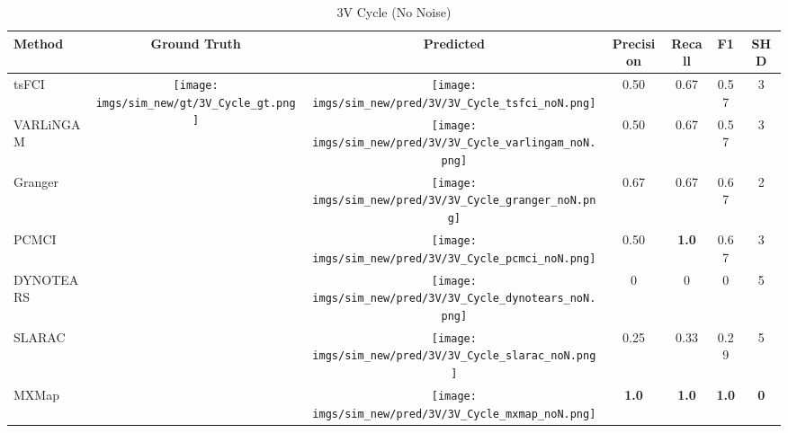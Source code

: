 \begin{table}[htb]
\begin{tabular}{l|c|c|c|c|c|c}
Method    & Ground Truth      & Predicted & Precision    & Recall       & F1           & SHD        \\ \hline
tsFCI     & \multirow{7}{*}[-6.2em]{\begin{minipage}{.17\linewidth} \centering \texttt{[image: imgs/sim\_new/gt/3V\_Cycle\_gt.png]} \end{minipage}} &  \begin{minipage}{.17\linewidth} \centering \texttt{[image: imgs/sim\_new/pred/3V/3V\_Cycle\_tsfci\_noN.png]} \end{minipage}         & 0.50         & 0.67         & 0.57         & 3          \\
VARLiNGAM &                   & \begin{minipage}{.17\linewidth} \centering \texttt{[image: imgs/sim\_new/pred/3V/3V\_Cycle\_varlingam\_noN.png]} \end{minipage} & 0.50         & 0.67         & 0.57         & 3          \\
Granger   &                   & \begin{minipage}{.17\linewidth} \centering \texttt{[image: imgs/sim\_new/pred/3V/3V\_Cycle\_granger\_noN.png]} \end{minipage} & 0.67         & 0.67         & 0.67         & 2          \\
PCMCI     &                   & \begin{minipage}{.17\linewidth} \centering \texttt{[image: imgs/sim\_new/pred/3V/3V\_Cycle\_pcmci\_noN.png]} \end{minipage} & 0.50         & \textbf{1.0} & 0.67         & 3          \\
DYNOTEARS &                   & \begin{minipage}{.17\linewidth} \centering \texttt{[image: imgs/sim\_new/pred/3V/3V\_Cycle\_dynotears\_noN.png]} \end{minipage} & 0            & 0            & 0            & 5          \\
SLARAC    &                   & \begin{minipage}{.17\linewidth} \centering \texttt{[image: imgs/sim\_new/pred/3V/3V\_Cycle\_slarac\_noN.png]} \end{minipage} & 0.25         & 0.33         & 0.29         & 5          \\ \cline{1-1} \cline{3-7} 
MXMap     &                   & \begin{minipage}{.17\linewidth} \centering \texttt{[image: imgs/sim\_new/pred/3V/3V\_Cycle\_mxmap\_noN.png]} \end{minipage} & \textbf{1.0} & \textbf{1.0} & \textbf{1.0} & \textbf{0}
\end{tabular}
\caption{3V Cycle (No Noise)}
\label{tab:3V_Cycle_noN}
\end{table}


